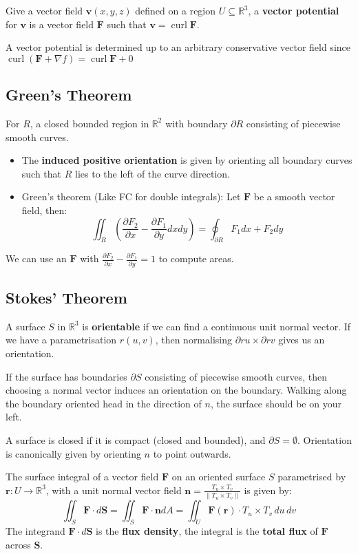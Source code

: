 \documentclass[a4paper]{article}
\newcommand{\RR}{\mathbb{R}}
\def\pp#1#2{\frac{\partial #1}{\partial #2}}
\def\curl{\operatorname{curl}}
\begin{document}
\begin{multicols}{2}
	Give a vector field $\mathbf{v}(x,y,z)$ defined on a region $U\subseteq\RR^3$, a \textbf{vector potential} for $\mathbf{v}$ is a vector field $\mathbf{F}$ such that $\mathbf{v}=\curl \mathbf{F}$.

	A vector potential is determined up to an arbitrary conservative vector field since $\curl(\mathbf{F}+\nabla f)=\curl \mathbf{F} +0$


	\subsection*{Green's Theorem}
	For $R$, a closed bounded region in $\RR^2$ with boundary $\partial R$ consisting of piecewise smooth curves.
	\begin{itemize}
		\item 	The \textbf{induced positive orientation} is given by orienting all boundary curves such that $R$ lies to the left of the curve direction.
		\item Green's theorem (Like FC for double integrals): Let $\mathbf{F}$ be a smooth vector field, then:
		      $$\iint_R\left( \pp{F_2}x - \pp{F_1}{y}dxdy \right)=\oint_{\partial R}F_1dx +F_2dy$$
	\end{itemize}
	We can use an $\mathbf{F}$ with $\pp{F_2}x - \pp{F_1}{y}=1$ to compute areas.

	\subsection*{Stokes' Theorem}

	A surface $S$ in $\RR^3$ is \textbf{orientable} if we can find a continuous unit normal vector. If we have a parametrisation $r(u,v)$, then normalising $\partial{r}u\times\partial{r}v$ gives us an orientation.

	If the surface has boundaries $\partial S$ consisting of piecewise smooth curves, then choosing a normal vector induces an orientation on the boundary. Walking along the boundary oriented head in the direction of $n$, the surface should be on your left.

	A surface is closed if it is compact (closed and bounded), and $\partial S=\emptyset$. Orientation is canonically given by orienting $n$ to point outwards.

	The surface integral of a vector field $\mathbf{F}$ on an oriented surface $S$ parametrised by $\mathbf{r}:U\to\RR^3$, with a unit normal vector field $\mathbf{n}=\frac{T_u\times T_v}{\|T_u\times T_v\|}$ is given by:
	\[
		\iint_S \mathbf{F}\cdot d\mathbf{S}=
		\iint_S \mathbf{F}\cdot \mathbf{n}dA=
		\iint_U \mathbf{F}(\mathbf{r})\cdot T_u\times T_v \,du\,dv
	\]
	The integrand $\mathbf{F}\cdot d\mathbf{S}$ is the \textbf{flux density}, the integral is the
	\textbf{total flux} of $\mathbf{F}$ across $\mathbf{S}$.


\end{multicols}
\end{document}
